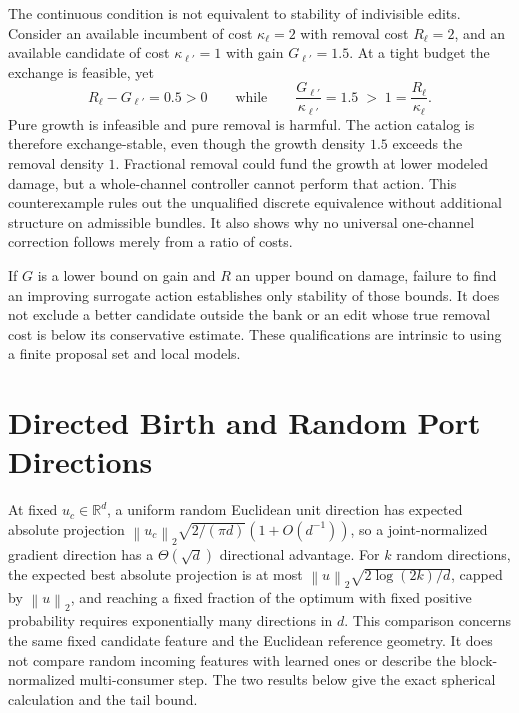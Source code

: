 \documentclass[10pt]{article}
\theoremstyle{paper}
\newcommand{\R}{\mathbb R}
\newcommand{\norm}[1]{\left\lVert #1\right\rVert}
\begin{document}
The continuous condition is not equivalent to stability of indivisible edits. Consider an available incumbent of cost $\kappa_\ell=2$ with removal cost $R_\ell=2$, and an available candidate of cost $\kappa_{\ell'}=1$ with gain $G_{\ell'}=1.5$. At a tight budget the exchange is feasible, yet
\begin{equation}
R_\ell-G_{\ell'}=0.5>0
\qquad\text{while}\qquad
\frac{G_{\ell'}}{\kappa_{\ell'}}=1.5\;>\;1=\frac{R_\ell}{\kappa_\ell}.
\label{eq:indivisible}
\end{equation} Pure growth is infeasible and pure removal is harmful. The action catalog is therefore exchange-stable, even though the growth density $1.5$ exceeds the removal density $1$. Fractional removal could fund the growth at lower modeled damage, but a whole-channel controller cannot perform that action. This counterexample rules out the unqualified discrete equivalence without additional structure on admissible bundles. It also shows why no universal one-channel correction follows merely from a ratio of costs.

If $G$ is a lower bound on gain and $R$ an upper bound on damage, failure to find an improving surrogate action establishes only stability of those bounds. It does not exclude a better candidate outside the bank or an edit whose true removal cost is below its conservative estimate. These qualifications are intrinsic to using a finite proposal set and local models.

\section{Directed Birth and Random Port Directions}
\label{app:random}
At fixed $u_c\in\R^d$, a uniform random Euclidean unit direction has expected absolute projection $\norm{u_c}_2\sqrt{2/(\pi d)}(1+O(d^{-1}))$, so a joint-normalized gradient direction has a $\Theta(\sqrt d)$ directional advantage. For $k$ random directions, the expected best absolute projection is at most $\norm u_2\sqrt{2\log(2k)/d}$, capped by $\norm u_2$, and reaching a fixed fraction of the optimum with fixed positive probability requires exponentially many directions in $d$. This comparison concerns the same fixed candidate feature and the Euclidean reference geometry. It does not compare random incoming features with learned ones or describe the block-normalized multi-consumer step. The two results below give the exact spherical calculation and the tail bound.
\end{document}

